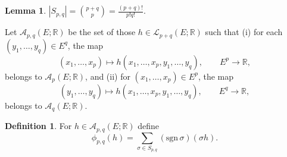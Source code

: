 \documentclass{article}
\newcommand{\sgn}{\mathrm{sgn}\,}
\theoremstyle{definition}
\newtheorem{lemma}[theorem]{Lemma}
\theoremstyle{definition}
\newtheorem{definition}[theorem]{Definition}
\begin{document}
\begin{lemma}
$|S_{p,q}| = \binom{p+q}{p} = \frac{(p+q)!}{p!q!}$.
\end{lemma}

Let $\mathscr{A}_{p,q}(E;\mathbb{R})$ be the set of those
$h \in \mathscr{L}_{p+q}(E;\mathbb{R})$ such that (i) for each $(y_1,\ldots,y_q) \in E^q$, the map
\[
(x_1,\ldots,x_p) \mapsto h(x_1,\ldots,x_p,y_1,\ldots,y_q),\qquad
E^p \to \mathbb{R},
\]
belongs to $\mathscr{A}_p(E;\mathbb{R})$, and (ii)
for $(x_1,\ldots,x_p) \in E^p$, the map
\[
(y_1,\ldots,y_q) \mapsto h(x_1,\ldots,x_p,y_1,\ldots,y_q),
\qquad E^q \to \mathbb{R},
\]
belongs to $\mathscr{A}_q(E;\mathbb{R})$.

\begin{definition}
For $h \in \mathscr{A}_{p,q}(E;\mathbb{R})$ define
\[
\phi_{p,q}(h) = \sum_{\sigma \in S_{p,q}} (\sgn \sigma) (\sigma h).
\]
\end{definition}
\end{document}
